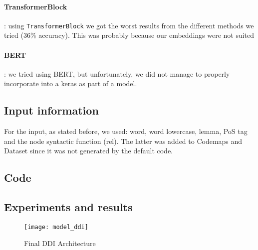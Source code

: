 \paragraph{TransformerBlock}: using \texttt{TransformerBlock} we got the worst results from the
different methods we tried (36\% accuracy). This was probably because our embeddings were not suited

\paragraph{BERT}: we tried using BERT, but unfortunately, we did not manage to properly incorporate
into a keras as part of a model.


\subsection{Input information}%
\label{sub:ddi-input}

For the input, as stated before, we used:
word, word lowercase, lemma, PoS tag and the node syntactic function (rel).
The latter was added to Codemaps and Dataset since it was not generated by the default code.

\subsection{Code}%
\label{sub:ddi-code}

\subsection{Experiments and results}%
\label{sub:ddi-experiments}

\begin{figure}[H]
\texttt{[image: model\_ddi]}
\caption{Final DDI Architecture}
\end{figure}